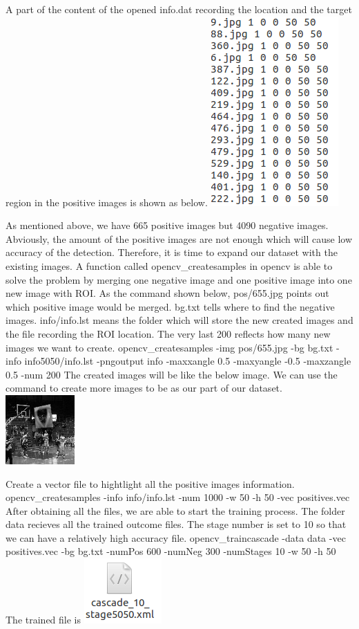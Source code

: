 \documentclass[11pt]{article}
\makeatletter
\def\maxwidth{\ifdim\Gin@nat@width>\linewidth\linewidth
    \else\Gin@nat@width\fi}
\let\Oldincludegraphics\includegraphics
\renewcommand{\includegraphics}[1]{\Oldincludegraphics[width=.8\maxwidth]{#1}}
\makeatother
\begin{document}
A part of the content of the opened info.dat recording the location and
the target region in the positive images is shown as below.
\includegraphics{info.png}

    As mentioned above, we have 665 positive images but 4090 negative
images. Abviously, the amount of the positive images are not enough
which will cause low accuracy of the detection. Therefore, it is time to
expand our dataset with the existing images. A function called
opencv\_createsamples in opencv is able to solve the problem by merging
one negative image and one positive image into one new image with ROI.
As the command shown below, pos/655.jpg points out which positive image
would be merged. bg.txt tells where to find the negative images.
info/info.lst means the folder which will store the new created images
and the file recording the ROI location. The very last 200 reflects how
many new images we want to create.
opencv_createsamples -img pos/655.jpg -bg bg.txt -info info5050/info.lst -pngoutput info -maxxangle 0.5 -maxyangle -0.5 -maxzangle 0.5 -num 200
    The created images will be like the below image. We can use the command
to create more images to be as our part of our dataset.
\includegraphics{vc_training/info5050/0001_0037_0012_0036_0036.jpg}

    Create a vector file to hightlight all the positive images information.
opencv_createsamples -info info/info.lst -num 1000 -w 50 -h 50 -vec positives.vec
    After obtaining all the files, we are able to start the training
process. The folder data recieves all the trained outcome files. The
stage number is set to 10 so that we can have a relatively high accuracy
file.
opencv_traincascade -data data -vec positives.vec -bg bg.txt -numPos 600 -numNeg 300 -numStages 10 -w 50 -h 50
    The trained file is \includegraphics{file.png}
\end{document}
